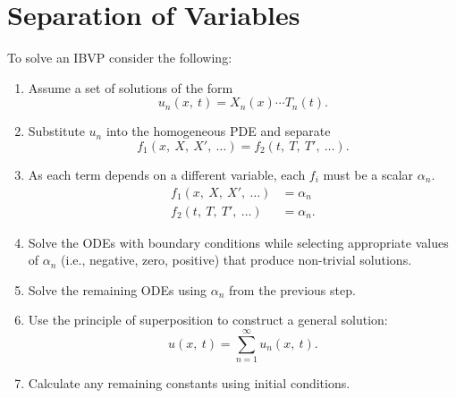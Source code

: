 \documentclass{article}
\begin{document}
\section{Separation of Variables}
To solve an IBVP consider the following:
\begin{enumerate}
    \item Assume a set of solutions of the form
          \begin{equation*}
              u_n\left( x,\: t \right) = X_n\left( x \right) \cdots T_n\left( t \right).
          \end{equation*}
    \item Substitute \(u_n\) into the homogeneous PDE and separate
          \begin{equation*}
              f_1\left( x,\: X,\: X',\: \dots \right) = f_2\left( t,\: T,\: T',\: \dots \right).
          \end{equation*}
    \item As each term depends on a different variable,
          each \(f_i\) must be a scalar \(\alpha_n\).
          \begin{align*}
              f_1\left( x,\: X,\: X',\: \dots \right) & = \alpha_n  \\
              f_2\left( t,\: T,\: T',\: \dots \right) & = \alpha_n.
          \end{align*}
    \item Solve the ODEs with boundary conditions while selecting appropriate values of \(\alpha_n\) (i.e., negative, zero, positive) that produce non-trivial solutions.
    \item Solve the remaining ODEs using \(\alpha_n\) from the previous step.
    \item Use the principle of superposition to construct a general solution:
          \begin{equation*}
              u\left( x,\: t \right) = \sum_{n = 1}^\infty u_n\left( x,\: t \right).
          \end{equation*}
    \item Calculate any remaining constants using initial conditions.
\end{enumerate}
\end{document}
